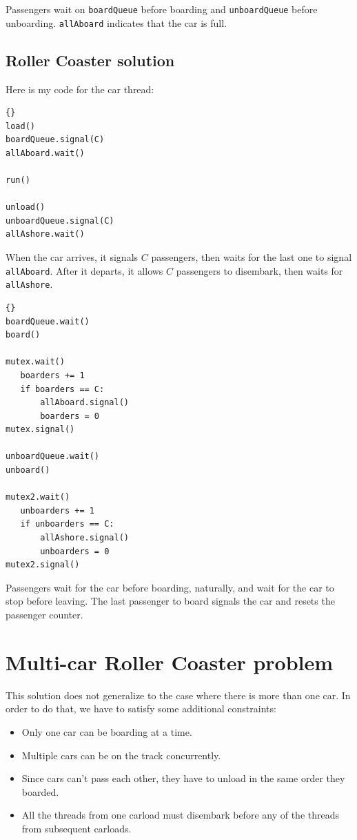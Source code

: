 \documentclass{book}
\newcommand{\clearemptydoublepage}{\newpage\cleardoublepage}
\begin{document}
Passengers wait on {\tt boardQueue} before boarding and
{\tt unboardQueue} before unboarding.  {\tt allAboard}
indicates that the car is full.


\clearemptydoublepage
\subsection{Roller Coaster solution}

Here is my code for the car thread:

\begin{lstlisting}[title={Roller Coaster solution (car)}]{}
load()
boardQueue.signal(C)
allAboard.wait()

run()

unload()
unboardQueue.signal(C)
allAshore.wait()
\end{lstlisting}

When the car arrives, it signals $C$ passengers,
then waits for the last one to signal {\tt allAboard}.
After it departs, it allows $C$ passengers to disembark,
then waits for {\tt allAshore}.

\begin{lstlisting}[title={Roller Coaster solution (passenger)}]{}
boardQueue.wait()
board()

mutex.wait()
   boarders += 1
   if boarders == C:
       allAboard.signal()
       boarders = 0
mutex.signal()

unboardQueue.wait()
unboard()

mutex2.wait()
   unboarders += 1
   if unboarders == C:
       allAshore.signal()
       unboarders = 0
mutex2.signal()
\end{lstlisting}

Passengers wait for the car before boarding, naturally, and wait for
the car to stop before leaving.  The last passenger to board signals
the car and resets the passenger counter.


\clearemptydoublepage
\section{Multi-car Roller Coaster problem}

This solution does not generalize to the case where there is more
than one car.  In order to do that, we have to satisfy some additional
constraints:

\begin{itemize}

\item Only one car can be boarding at a time.

\item Multiple cars can be on the track concurrently.

\item Since cars can't pass each other, they have to unload
in the same order they boarded.

\item All the threads from one carload must disembark before
any of the threads from subsequent carloads.

\end{itemize}
\end{document}
